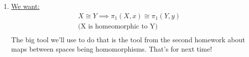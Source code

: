 \begin{enumerate}
\begin{proof}
                This shows that
                \begin{align*}
                    \phi([f]*[g])=m+n\\
                    =\tilde{f}(1)+\tilde{g}(1)\\
                    =\phi([f])+\phi([g])\\
                \end{align*}
            \end{proof}
        \item \underline{We want:}
            \begin{align*}
                X\cong Y\implies \pi_1(X,x)\cong\pi_1(Y,y)\\
                \text{(X is homeomorphic to Y)}\\
            \end{align*}
            The big tool we'll use to do that is the tool from the second homework
            about maps between spaces being homomorphisms. That's for next time!
    \end{enumerate}
